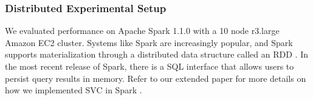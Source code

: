 \subsubsection{Distributed Experimental Setup}
We evaluated performance on Apache Spark 1.1.0 with a 10 node r3.large Amazon EC2 cluster.
Systems like Spark are increasingly popular, and Spark supports materialization through a distributed data structure called an RDD \cite{zaharia2012resilient}.
In the most recent release of Spark, there is a SQL interface that allows users to persist query results in memory.
Refer to our extended paper for more details on how we implemented SVC in Spark .

